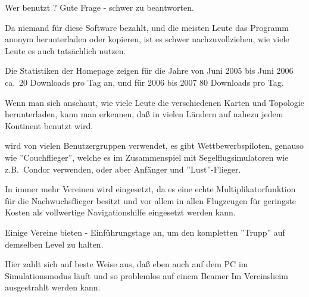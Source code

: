 Wer benutzt \xc? Gute Frage - schwer zu beantworten. 

Da niemand für diese Software bezahlt, und die meisten Leute das Programm 
anonym herunterladen oder kopieren, ist es schwer nachzuvollziehen,  wie viele Leute es auch tatsächlich nutzen.

Die Statistiken der Homepage zeigen für die Jahre von Juni 2005 bis Juni 2006 ca.\ 20 Downloads pro Tag an, und für 2006 bis 2007 80 Downloads pro Tag.

Wenn man sich anschaut, wie viele Leute die verschiedenen Karten und Topologie  herunterladen, kann man erkennen, daß \xc in vielen Ländern auf nahezu jedem Kontinent benutzt wird.

\xc wird von vielen Benutzergruppen verwendet, es gibt Wettbewerbspiloten, genauso wie ''Couchflieger'',
welche es im Zusammenspiel mit Segelflugsimulatoren wie z.B.\ Condor verwenden, oder aber Anfänger und ''Lust''-Flieger.

In immer mehr Vereinen wird \xc eingesetzt, da es eine echte Multiplikatorfunktion für die Nachwuchsflieger besitzt  und vor allem
in allen Flugzeugen für geringste Kosten als vollwertige Navigationshilfe eingesetzt werden kann.

Einige Vereine bieten \xc - Einführungstage an, um den kompletten ''Trupp'' auf demselben Level zu halten.

Hier zahlt sich auf beste Weise aus, daß \xc eben auch auf dem PC im Simulationsmodus läuft und so problemlos auf einem Beamer Im Vereinsheim 
ausgestrahlt werden kann.


